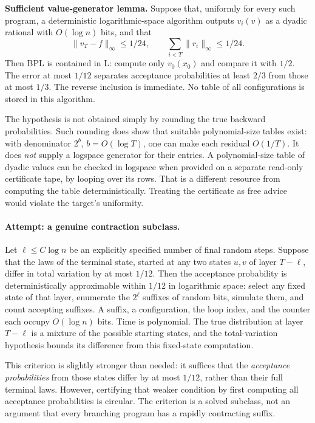 \documentclass[11pt,a4paper]{article}
\numberwithin{equation}{section}
\begin{document}
\textbf{Sufficient value-generator lemma.} Suppose that, uniformly for
every such program, a deterministic logarithmic-space algorithm outputs
$v_i(v)$ as a dyadic rational with $O(\log n)$ bits, and that
\[
 \|v_T-f\|_\infty\le1/24,
 \qquad\sum_{i<T}\|r_i\|_\infty\le1/24.
\]
Then BPL is contained in L: compute only $v_0(x_0)$ and compare it with
$1/2$. The error at most $1/12$ separates acceptance probabilities at
least $2/3$ from those at most $1/3$. The reverse inclusion is immediate.
No table of all configurations is stored in this algorithm.

The hypothesis is not obtained simply by rounding the true backward
probabilities. Such rounding does show that suitable polynomial-size
tables exist: with denominator $2^b$, $b=O(\log T)$, one can make each
residual $O(1/T)$. It does \emph{not} supply a logspace generator for their
entries. A polynomial-size table of dyadic values can be checked in
logspace when provided on a separate read-only certificate tape, by
looping over its rows. That is a different resource from computing the
table deterministically. Treating the certificate as free advice would
violate the target's uniformity.

\paragraph{Attempt: a genuine contraction subclass.}
Let $\ell\le C\log n$ be an explicitly specified number of final random
steps. Suppose that the laws of the terminal state, started at any two
states $u,v$ of layer $T-\ell$, differ in total variation by at most
$1/12$. Then the acceptance probability is deterministically
approximable within $1/12$ in logarithmic space: select any fixed state
of that layer, enumerate the $2^\ell$ suffixes of random bits, simulate
them, and count accepting suffixes. A suffix, a configuration, the loop
index, and the counter each occupy $O(\log n)$ bits. Time is polynomial.
The true distribution at layer $T-\ell$ is a mixture of the possible
starting states, and the total-variation hypothesis bounds its difference
from this fixed-state computation.

This criterion is slightly stronger than needed: it suffices that the
\emph{acceptance probabilities} from those states differ by at most
$1/12$, rather than their full terminal laws. However, certifying that
weaker condition by first computing all acceptance probabilities is
circular. The criterion is a solved subclass, not an argument that every
branching program has a rapidly contracting suffix.
\end{document}
